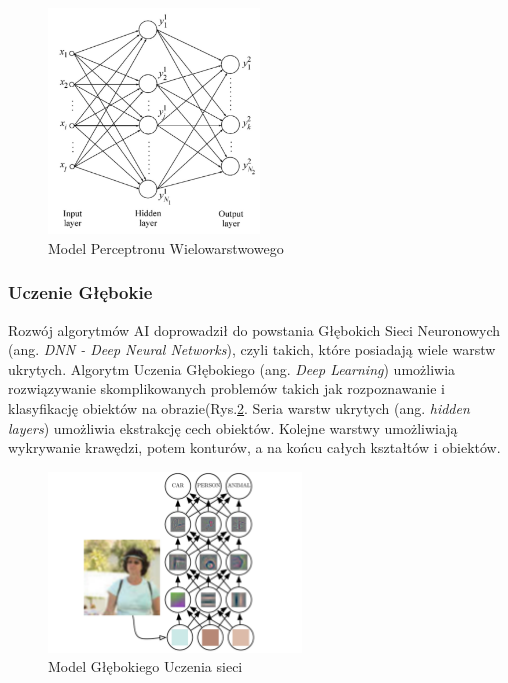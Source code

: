 \begin{figure}
  \centering
  \includegraphics[width=0.5\textwidth]{img/mlp2.png}
  \caption{Model Perceptronu Wielowarstwowego}
  \label{mlp}
\end{figure}

\subsubsection{Uczenie Głębokie}

Rozwój algorytmów AI doprowadził do powstania Głębokich Sieci Neuronowych (ang. 
\emph{DNN - Deep Neural Networks}), czyli takich, które posiadają wiele 
warstw ukrytych\cite{Goodfellow-et-al-2016}. Algorytm Uczenia Głębokiego (ang. 
\emph{Deep Learning}) umożliwia rozwiązywanie skomplikowanych problemów takich 
jak rozpoznawanie i klasyfikację obiektów na obrazie(Rys.\ref{dnn}. Seria warstw 
ukrytych (ang. \emph{hidden layers}) umożliwia ekstrakcję cech obiektów. 
Kolejne warstwy umożliwiają wykrywanie krawędzi, potem konturów, a na końcu 
całych kształtów i obiektów.

\begin{figure}[!h]
  \centering
  \includegraphics[width=0.6\textwidth]{img/dnn-object-recog.png}
  \caption{Model Głębokiego Uczenia sieci}
  \label{dnn}
\end{figure}


